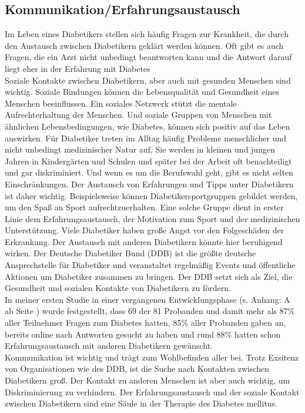 \subsection{Kommunikation/Erfahrungsaustausch}
	Im Leben eines Diabetikers stellen sich häufig Fragen zur Krankheit, die durch den Austausch zwischen Diabetikern geklärt werden können. Oft gibt es auch Fragen, die ein Arzt nicht unbedingt beantworten kann und die Antwort darauf liegt eher in der Erfahrung mit Diabetes\cite{JR}\\
	Soziale Kontakte zwischen Diabetikern, aber auch mit gesunden Menschen sind wichtig. Soziale Bindungen können die Lebensqualität und Gesundheit eines Menschen beeinflussen. Ein soziales Netzwerk stützt die mentale Aufrechterhaltung der Menschen. Und soziale Gruppen von Menschen mit ähnlichen Lebensbedingungen, wie Diabetes, können sich positiv auf das Leben auswirken. \newline
	Für Diabetiker treten im Alltag häufig Probleme menschlicher und nicht unbedingt medizinischer Natur auf. Sie werden in kleinen und jungen Jahren in Kindergärten und Schulen und später bei der Arbeit oft benachteiligt und gar diskriminiert. Und wenn es um die Berufswahl geht, gibt es nicht selten Einschränkungen. Der Austausch von Erfahrungen und Tipps unter Diabetikern ist daher wichtig. Beispielsweise können Diabetikersportgruppen gebildet werden, um den Spaß an Sport aufrechtzuerhalten.  Eine solche Gruppe dient in erster Linie dem Erfahrungsaustausch, der Motivation zum Sport und der medizinischen Unterstützung. Viele Diabetiker haben große Angst vor den Folgeschäden der Erkrankung. Der Austausch mit anderen Diabetikern könnte hier beruhigend wirken. \cite{SG}\newline
	Der Deutsche Diabetiker Bund (DDB) ist die größte deutsche Ansprechstelle für Diabetiker und veranstaltet regelmäßig Events und öffentliche Aktionen um Diabetiker zusammen zu bringen. Der DDB setzt sich als Ziel, die Gesundheit und sozialen Kontakte von Diabetikern zu fördern.\cite{JR}\\
	In meiner ersten Studie in einer vergangenen Entwicklungsphase (s. Anhang: A  ab Seite \pageref{section:Evaluation}) wurde festgestellt, dass 69 der 81 Probanden und damit mehr als 87\% aller Teilnehmer Fragen zum Diabetes hatten, 85\% aller Probanden gaben an, bereits online nach Antworten gesucht zu haben und rund 88\% hatten schon Erfahrungsaustausch mit anderen Diabetikern gewünscht.\\
	Kommunikation ist wichtig und trägt zum Wohlbefinden aller bei. Trotz Exsitenz von Organisationen wie des DDB,  ist die Suche nach Kontakten zwischen Diabetikern groß.  Der Kontakt zu anderen Menschen ist aber auch wichtig, um Diskriminierung zu verhindern. Der Erfahrungsaustausch und der soziale Kontakt zwischen Diabetikern sind eine Säule in der Therapie des Diabetes mellitus.
